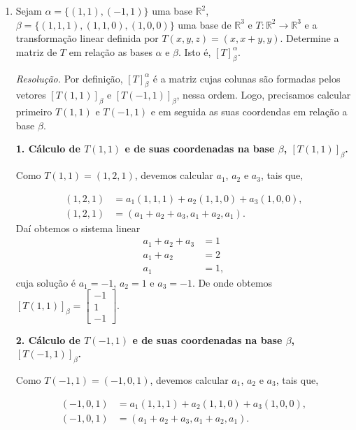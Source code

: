 \begin{enumerate}
\item
Sejam $\alpha=\{ (1,1), (-1,1)\}$ uma base $\mathbb{R}^2$,  $\beta=\{(1,1,1), (1,1,0),(1,0,0)\}$ uma  base de $\mathbb{R}^3$  e $T: \mathbb{R}^2 \rightarrow \mathbb{R}^3$ e  a transformação linear definida por $T(x,y,z)=(x,x+y,y)$. Determine a matriz  de $T$ em relação as bases ${\alpha}$ e ${\beta}$. Isto é, $[T]_{\beta}^{\alpha}$.

\vspace{0.5cm}
\noindent\textit{Resolução.} Por definição,  $[T]_{\beta}^{\alpha}$ é  a matriz cujas colunas são formadas pelos vetores  $[T(1,1)]_{\beta}$  e  $[T(-1,1)]_{\beta}$, nessa ordem. Logo, precisamos calcular primeiro $T(1,1)$ e $T(-1,1)$ e em seguida as suas coordendas em relação a base $\beta$.

\vspace{0.5cm}
\textbf{1. Cálculo de  $T(1,1)$ e de suas coordenadas na base $\beta$, $[T(1,1)]_{\beta}$.}

Como $T(1,1)=(1, 2, 1)$, devemos calcular $a_{1}$, $a_{2}$ e $a_{3}$, tais que,

\begin{align*}
(1,2,1)&=a_1(1, 1, 1)+a_2(1,1,0)+a_3(1,0,0), \\
(1,2,1)&=(a_1+a_2+a_3, a_1+a_2,a_1).
\end{align*}
Daí  obtemos o sistema linear
\begin{align*}
a_1+a_2+a_3 &=1 \\
a_1+a_2 &=2 \\
a_1&= 1,
\end{align*}
cuja solução é $a_1=-1$, $a_2=1$ e $a_3=-1$. De onde obtemos
$[T(1,1)]_{\beta}=\left[ \begin{array}{c}-1 \\ 1 \\ -1\end{array} \right]$.

\vspace{0.5cm}
\textbf{2. Cálculo de  $T(-1,1)$ e de suas coordenadas na base $\beta$, $[T(-1,1)]_{\beta}$.}

Como $T(-1,1)=(-1, 0, 1)$, devemos calcular $a_{1}$, $a_{2}$ e $a_{3}$, tais que,

\begin{align*}
(-1,0,1)&=a_1(1, 1, 1)+a_2(1,1,0)+a_3(1,0,0), \\
(-1,0,1)&=(a_1+a_2+a_3, a_1+a_2,a_1).
\end{align*}


\end{enumerate}
